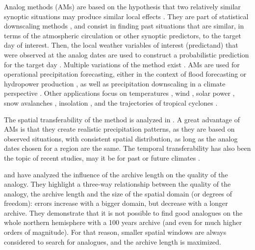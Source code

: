 \documentclass[hess, manuscript]{copernicus}
\begin{document}
\introduction  %
\label{sec:introduction}

Analog methods (AMs) are based on the hypothesis that two relatively similar synoptic situations may produce similar local effects \citep{Lorenz1956, Lorenz1969}. They are part of statistical downscaling methods \citep{Maraun2010}, and consist in finding past situations that are similar, in terms of the atmospheric circulation or other synoptic predictors, to the target day of interest. Then, the local weather variables of interest (predictand) that were observed at the analog dates are used to construct a probabilistic prediction for the target day \citep{Duband1970, Zorita1999}. Multiple variations of the method exist \citep[a non-exhaustive listing can be found in][]{BenDaoud2016}. AMs are used for operational precipitation forecasting, either in the context of flood forecasting or hydropower production \citep[e.g.,][]{Guilbaud1997, Bontron2005, Hamill2006, Desaint2008a, GarciaHernandez2009b, Bliefernicht2010, Marty2010, Marty2012, Horton2012, Obled2014, Hamill2015, BenDaoud2016}, as well as precipitation downscaling in a climate perspective \citep[e.g.,][]{Radanovics2013, Chardon2014, Dayon2015}. Other applications focus on temperatures \citep{Radinovic1975, Woodcock1980, Kruizinga1983, DelleMonache2013, Caillouet2016}, wind \citep{Gordon1987, DelleMonache2013, DelleMonache2011, Vanvyve2015, Alessandrini2015, Junk2015, Junk2015c}, solar power \citep{Alessandrini2015a, Bessa2015}, snow avalanches \citep{Obled1980, Bolognesi1993}, insolation \citep{Bois1981}, and the trajectories of tropical cyclones \citep{Keenan1981, Sievers2000, Fraedrich2003}.

The spatial transferability of the method is analyzed in \citet{Chardon2014}. A great advantage of AMs is that they create realistic precipitation patterns, as they are based on observed situations, with consistent spatial distribution, as long as the analog dates chosen for a region are the same. The temporal transferability has also been the topic of recent studies, may it be for past or future climates \citep{Dayon2015, Caillouet2016}.

\citet{Ruosteenoja1988} and \citet{Vandendool1994} have analyzed the influence of the archive length on the quality of the analogy. They highlight a three-way relationship between the quality of the analogy, the archive length and the size of the spatial domain (or degrees of freedom): errors increase with a bigger domain, but decrease with a longer archive. They demonstrate that it is not possible to find good analogues on the whole northern hemisphere with a 100 years archive (and even for much higher orders of magnitude). For that reason, smaller spatial windows are always considered to search for analogues, and the archive length is maximized. 
\end{document}
